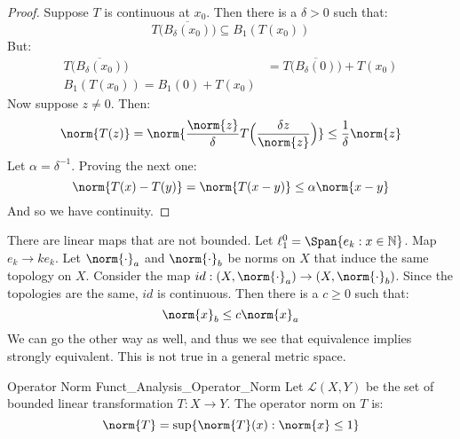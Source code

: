         \begin{proof}
            Suppose $T$ is continuous at $x_{0}$. Then there is a
            $\delta>0$ such that:
            \begin{equation}
                T\Big(\overline{B_{\delta}(x_{0})}\big)
                \subseteq{B}_{1}(T(x_{0}))
            \end{equation}
            But:
            \begin{align}
                T\Big(\overline{B_{\delta}(x_{0})}\big)
                &=T\Big(\overline{B_{\delta}(0)}\big)+T(x_{0})\\
                B_{1}(T(x_{0}))=
                B_{1}(0)+T(x_{0})
            \end{align}
            Now suppose $z\ne{0}$. Then:
            \begin{equation}
                \norm{T(z)}=
                \norm{\frac{\norm{z}}{\delta}
                      T\Big(\frac{\delta{z}}{\norm{z}}\Big)}
                \leq\frac{1}{\delta}\norm{z}
            \end{equation}
            Let $\alpha=\delta^{\minus{1}}$.
            Proving the next one:
            \begin{equation}
                \norm{T(x)-T(y)}=\norm{T(x-y)}
                \leq\alpha\norm{x-y}
            \end{equation}
            And so we have continuity.
        \end{proof}
        There are linear maps that are not bounded. Let
        $\ell_{1}^{0}=\Span\{e_{k}:x\in\mathbb{N}\}$. Map
        $e_{k}\rightarrow{k}e_{k}$. Let
        $\norm{\cdot}_{a}$ and $\norm{\cdot}_{b}$ be norms on
        $X$ that induce the same topology on $X$. Consider the map
        $id:(X,\norm{\cdot}_{a})\rightarrow(X,\norm{\cdot}_{b})$.
        Since the topologies are the same, $id$ is continuous.
        Then there is a $c\geq{0}$ such that:
        \begin{equation}
            \norm{x}_{b}\leq{c}\norm{x}_{a}
        \end{equation}
        We can go the other way as well, and thus we see that
        equivalence implies strongly equivalent. This is not true
        in a general metric space.
        \begin{ldefinition}{Operator Norm}
              {Funct_Analysis_Operator_Norm}
            Let $\mathscr{L}(X,Y)$ be the set of bounded linear
            transformation $T:X\rightarrow{Y}$. The operator
            norm on $T$ is:
            \begin{equation}
                \norm{T}=\sup\{\norm{T}(x):\norm{x}\leq{1}\}
            \end{equation}
        \end{ldefinition}
